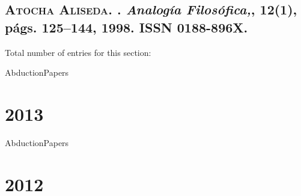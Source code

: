 \subsection*{\textsc{Atocha Aliseda}.
\newblock {}.
\newblock \emph{Analog{\'i}a Filos{\'o}fica,}, 12(1), p\'ags. 125--144, 1998.
\newblock ISSN 0188-896X.
}
Total number of entries for this section: 

\restartNumb

\begin{btUnit}
 \begin{btSect}{AbductionPapers}
  \section*{2013}
  \nocite{Ramirez:PosibilidadJustificacionDeduccion}
  \nocite{Nunez:EpistemologieDecouverte}
  \btPrintCited
 \end{btSect}
\end{btUnit}

\keepNumb

\begin{btUnit}
 \begin{btSect}{AbductionPapers}
  \section*{2012}
  \nocite{Jesper:BrilloImagen}
  \nocite{Nubiola:NewDevelopmentsPeirce}
  \btPrintCited
 \end{btSect}
\end{btUnit}

